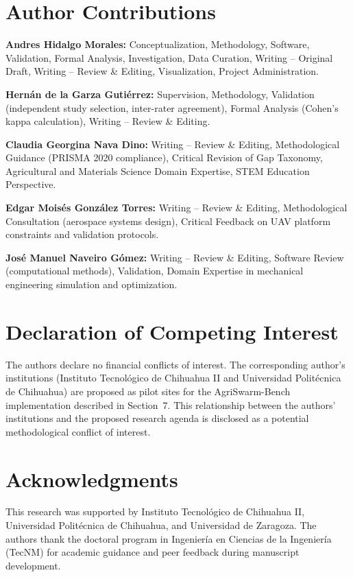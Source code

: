 \documentclass[review,3p,times]{elsarticle}
\begin{document}
\section*{Author Contributions}
\textbf{Andres Hidalgo Morales:} Conceptualization, Methodology, Software, Validation, Formal Analysis, Investigation, Data Curation, Writing -- Original Draft, Writing -- Review \& Editing, Visualization, Project Administration.

\textbf{Hernán de la Garza Gutiérrez:} Supervision, Methodology, Validation (independent study selection, inter-rater agreement), Formal Analysis (Cohen's kappa calculation), Writing -- Review \& Editing.

\textbf{Claudia Georgina Nava Dino:} Writing -- Review \& Editing, Methodological Guidance (PRISMA 2020 compliance), Critical Revision of Gap Taxonomy, Agricultural and Materials Science Domain Expertise, STEM Education Perspective.

\textbf{Edgar Moisés González Torres:} Writing -- Review \& Editing, Methodological Consultation (aerospace systems design), Critical Feedback on UAV platform constraints and validation protocols.

\textbf{José Manuel Naveiro Gómez:} Writing -- Review \& Editing, Software Review (computational methods), Validation, Domain Expertise in mechanical engineering simulation and optimization.

\section*{Declaration of Competing Interest}
The authors declare no financial conflicts of interest. The corresponding author's institutions (Instituto Tecnológico de Chihuahua II and Universidad Politécnica de Chihuahua) are proposed as pilot sites for the AgriSwarm-Bench implementation described in Section~7. This relationship between the authors' institutions and the proposed research agenda is disclosed as a potential methodological conflict of interest.

\section*{Acknowledgments}
This research was supported by Instituto Tecnológico de Chihuahua II, Universidad Politécnica de Chihuahua, and Universidad de Zaragoza. The authors thank the doctoral program in Ingeniería en Ciencias de la Ingeniería (TecNM) for academic guidance and peer feedback during manuscript development.



\end{document}
